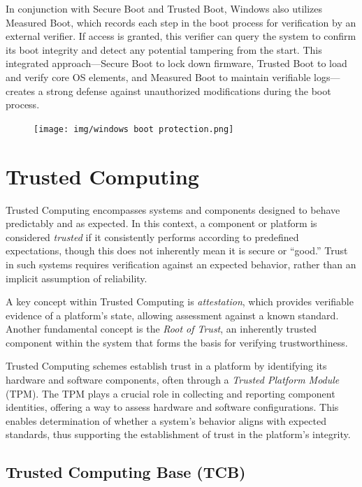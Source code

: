 In conjunction with Secure Boot and Trusted Boot, Windows also
utilizes Measured Boot, which records each step in the boot process
for verification by an external verifier. If access is granted, this
verifier can query the system to confirm its boot integrity and detect
any potential tampering from the start. This integrated
approach—Secure Boot to lock down firmware, Trusted Boot to load and
verify core OS elements, and Measured Boot to maintain verifiable
logs—creates a strong defense against unauthorized modifications
during the boot process.


\begin{figure}
  \centering
  \texttt{[image: img/windows boot
  protection.png]}
  \label{fig:windows boot protection}
\end{figure}

\section{Trusted Computing}

Trusted Computing encompasses systems and components designed 
to behave predictably and as expected. In this context, a component 
or platform is considered \textit{trusted} if it consistently performs 
according to predefined expectations, though this does not inherently 
mean it is secure or “good.” Trust in such systems requires verification 
against an expected behavior, rather than an implicit assumption of 
reliability.

A key concept within Trusted Computing is \textit{attestation}, which 
provides verifiable evidence of a platform’s state, allowing assessment 
against a known standard. Another fundamental concept is the 
\textit{Root of Trust}, an inherently trusted component within the 
system that forms the basis for verifying trustworthiness.

Trusted Computing schemes establish trust in a platform by 
identifying its hardware and software components, often through 
a \textit{Trusted Platform Module} (TPM). The TPM plays a crucial 
role in collecting and reporting component identities, offering a way 
to assess hardware and software configurations. This enables 
determination of whether a system’s behavior aligns with expected 
standards, thus supporting the establishment of trust in the platform’s 
integrity.

\subsection{Trusted Computing Base (TCB)}

